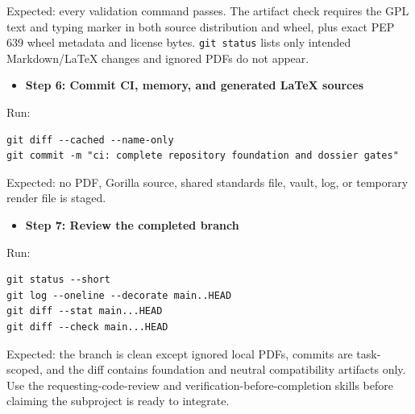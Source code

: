 \documentclass[
  letterpaper,
]{article}
\newcommand{\passthrough}[1]{#1}
\providecommand{\tightlist}{%
  \setlength{\itemsep}{0pt}\setlength{\parskip}{0pt}}
\begin{document}
Expected: every validation command passes. The artifact check requires the GPL text and typing marker in both source
distribution and wheel, plus exact PEP 639 wheel metadata and license bytes. \passthrough{\lstinline!git status!} lists
only intended Markdown/LaTeX changes and ignored PDFs do not appear.

\begin{itemize}
\tightlist
\item[$\boxtimes$]
  \textbf{Step 6: Commit CI, memory, and generated LaTeX sources}
\end{itemize}

Run:

\begin{lstlisting}
git diff --cached --name-only
git commit -m "ci: complete repository foundation and dossier gates"
\end{lstlisting}

Expected: no PDF, Gorilla source, shared standards file, vault, log, or temporary render file is staged.

\begin{itemize}
\tightlist
\item[$\boxtimes$]
  \textbf{Step 7: Review the completed branch}
\end{itemize}

Run:

\begin{lstlisting}
git status --short
git log --oneline --decorate main..HEAD
git diff --stat main...HEAD
git diff --check main...HEAD
\end{lstlisting}

Expected: the branch is clean except ignored local PDFs, commits are task-scoped, and the diff contains foundation and
neutral compatibility artifacts only. Use the requesting-code-review and verification-before-completion skills before
claiming the subproject is ready to integrate.
\end{document}
